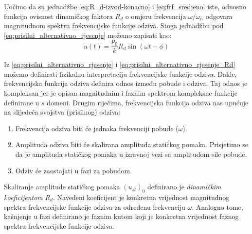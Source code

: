 Uočimo da su jednadžbe \eqref{eq:R_d-izvod-konacno} i \eqref{eq:frf_sredjeno} iste,
odnosno funkcija ovisnost dinamičkog faktora $R_d$ o omjeru frekvencija
$\omega/\omega_n$ odgovara magnitudnom spektru frekvencijske funkcije odziva. Stoga
jednadžbu pod \eqref{eq:prisilni_alternativno_rjesenje} možemo zapisati kao:
\begin{equation}\label{eq:prisilni_alternativno_rjesenje_Rd}
    u(t)=\frac{p_0}{k}R_d\sin(\omega t - \phi)
\end{equation}

Iz \eqref{eq:prisilni_alternativno_rjesenje} i \eqref{eq:prisilni_alternativno_rjesenje_Rd}
možemo definirati fizikalnu interpretaciju frekvencijske funkcije odziva.
Dakle, frekvencijska funkcija odziva definira odnos između pobude i
odziva. Taj odnos je kompleksan jer je opisan magnitudnim i faznim spektrom
kompleksne funkcije definirane u $s$ domeni. Drugim riječima, frekvencijska funkcija
odziva nas upućuje na slijedeća svojstva (prisilnog) odziva:
\begin{enumerate}
    \item Frekvencija odziva biti će jednaka frekvenciji pobude ($\omega$).
    \item Amplituda odziva biti će skalirana amplituda statičkog pomaka. Prisjetimo
        se da je amplituda statičkog pomaka u izravnoj vezi sa amplitudom sile pobude.
    \item Odziv će zaostajati u fazi za pobudom. 
\end{enumerate}

Skaliranje amplitude statičkog pomaka $(u_{st})_0$ definirano je \textit{dinamičkim
koeficijentom} $R_d$. Navedeni koeficijent je konkretna vrijednost magnitudnog
spektra frekvencijske funkcije odziva za određenu frekvenciju $\omega$. Analogno
tome, kašnjenje u fazi definirano je faznim kutom koji je konkretna vrijednost
faznog spektra frekvencijske funkcije odziva.

